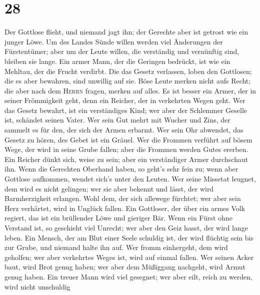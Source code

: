 \hypertarget{section-27}{%
\section{28}\label{section-27}}

 Der Gottlose flieht, und niemand jagt ihn; der Gerechte
aber ist getrost wie ein junger Löwe.  Um des Landes Sünde
willen werden viel Änderungen der Fürstentümer; aber um der Leute
willen, die verständig und vernünftig sind, bleiben sie lange.
 Ein armer Mann, der die Geringen bedrückt, ist wie ein
Mehltau, der die Frucht verdirbt.  Die das Gesetz
verlassen, loben den Gottlosen; die es aber bewahren, sind unwillig auf
sie.  Böse Leute merken nicht aufs Recht; die aber nach
dem \textsc{Herrn} fragen, merken auf alles.  Es ist
besser ein Armer, der in seiner Frömmigkeit geht, denn ein Reicher, der
in verkehrten Wegen geht.  Wer das Gesetz bewahrt, ist ein
verständiges Kind; wer aber der Schlemmer Geselle ist, schändet seinen
Vater.  Wer sein Gut mehrt mit Wucher und Zins, der
sammelt es für den, der sich der Armen erbarmt.  Wer sein
Ohr abwendet, das Gesetz zu hören, des Gebet ist ein Gräuel.
 Wer die Frommen verführt auf bösem Wege, der wird in
seine Grube fallen; aber die Frommen werden Gutes ererben.
 Ein Reicher dünkt sich, weise zu sein; aber ein
verständiger Armer durchschaut ihn.  Wenn die Gerechten
Oberhand haben, so geht's sehr fein zu; wenn aber Gottlose aufkommen,
wendet sich's unter den Leuten.  Wer seine Missetat
leugnet, dem wird es nicht gelingen; wer sie aber bekennt und lässt, der
wird Barmherzigkeit erlangen.  Wohl dem, der sich
allewege fürchtet; wer aber sein Herz verhärtet, wird in Unglück fallen.
 Ein Gottloser, der über ein armes Volk regiert, das ist
ein brüllender Löwe und gieriger Bär.  Wenn ein Fürst
ohne Verstand ist, so geschieht viel Unrecht; wer aber den Geiz hasst,
der wird lange leben.  Ein Mensch, der am Blut einer
Seele schuldig ist, der wird flüchtig sein bis zur Grube, und niemand
halte ihn auf.  Wer fromm einhergeht, dem wird geholfen;
wer aber verkehrtes Weges ist, wird auf einmal fallen. 
Wer seinen Acker baut, wird Brot genug haben; wer aber dem Müßiggang
nachgeht, wird Armut genug haben.  Ein treuer Mann wird
viel gesegnet; wer aber eilt, reich zu werden, wird nicht unschuldig
